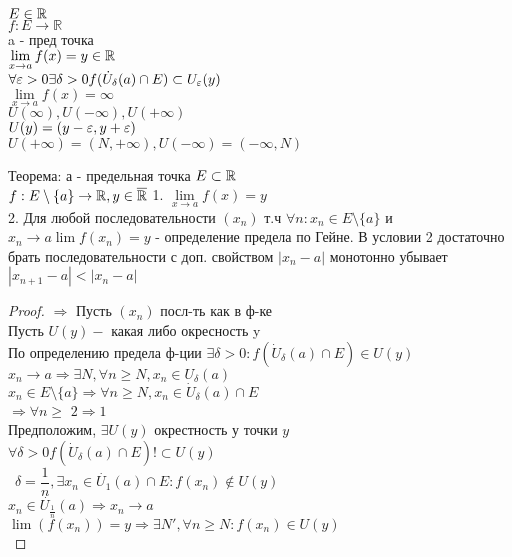 
$ E \in \mathbb{R} $ \\
$ f : E \rightarrow \mathbb{R } $\\
a - пред точка \\	
$ \lim\limits_{x \rightarrow a} f(x) = y \in \mathbb{R}$ \\
$ \forall \varepsilon > 0 \exists \delta > 0 f(\dot{U}_{\delta} (a) \cap E) \subset U_{\varepsilon} (y) $ \\
$ \lim\limits_{x \rightarrow a} f(x) = \infty $\\
$ U(\infty), U(-\infty), U(+\infty) $ \\
$ U(y) = (y-\varepsilon, y+\varepsilon) $ \\
$ U(+\infty) = (N, +\infty), U(-\infty) = (-\infty, N) $ \\

\begin{theorem}
Теорема: а - предельная точка  $ E \subset \mathbb{R} $ \\
$ f : E \setminus \{a\} \rightarrow \mathbb{R}, y \in \overline{\mathbb{R}}$
1. $ \lim\limits_{x \rightarrow a} f(x) = y $ \\
2. Для любой последовательности $(x_n)$ т.ч $\forall n : x_n \in E \setminus \{a\} $ и $ x_n \rightarrow a  \lim f(x_n) = y $ - определение предела по Гейне.
В условии 2 достаточно брать последовательности с доп. свойством $ | x_n - a | $ монотонно убывает $ |x_{n+1} - a | < | x_n - a | $ 
\begin{proof}
	$ \Rightarrow $ Пусть $(x_n)$ посл-ть как в ф-ке \\
	Пусть $ U(y) - $ какая либо окресность y \\
	По определению предела ф-ции $ \exists \delta > 0 : f(\dot{U}_{\delta} (a) \cap E)  \in U(y) $ \\
	$ x_n \rightarrow a \Rightarrow \exists N, \forall n \geq N, x_n \in U_{\delta} (a)$ \\
	$ x_n \in E \setminus \{a\} \Rightarrow \forall n \geq N, x_n \in \dot{U}_{\delta} (a) \cap E$ \\
	$ \Rightarrow \forall n \geq $
	$ 2 \Rightarrow 1 $ \\
	Предположим, $ \exists U(y) $ окрестность у точки $ y$ \\
	$ \forall \delta > 0 f(\dot{U}_{\delta} (a) \cap E)  !\subset U(y)$\\\
	$ \delta = \dfrac{1}{n}, \exists x_n \in \dot{U_1} (a) \cap E : f(x_n) \notin U(y) $ \\
	$ x_n \in \dot{U_{\frac{1}{n}}} (a) \Rightarrow x_n \rightarrow a $ \\
	$ \lim(f(x_n)) = y \Rightarrow \exists N', \forall n \geq N : f(x_n) \in U(y) $ \\
	
\end{proof}
\end{theorem}

